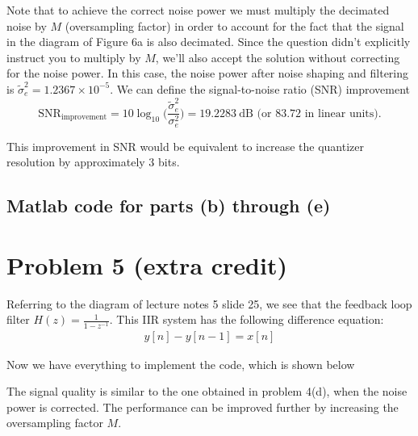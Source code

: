 \documentclass{article}
\begin{document}
Note that to achieve the correct noise power we must multiply the decimated noise by $M$ (oversampling factor) in order to account for the fact that the signal in the diagram of Figure 6a is also decimated. Since the question didn't explicitly instruct you to multiply by $M$, we'll also accept the solution without correcting for the noise power. In this case, the noise power after noise shaping and filtering is $\tilde{\sigma}_e^2 = 1.2367\times 10^{-5}$. We can define the signal-to-noise ratio (SNR) improvement 
\begin{equation}
\text{SNR}_{\text{improvement}} = 10\log_{10}\Big(\frac{\tilde{\sigma}_e^2}{\sigma_e^2}\Big) = 19.2283~\text{dB (or 83.72 in linear units)}.
\end{equation}

This improvement in SNR would be equivalent to increase the quantizer resolution by approximately 3 bits.

\subsection{Matlab code for parts (b) through (e)}


\section{Problem 5 (extra credit)}

Referring to the diagram of lecture notes 5 slide 25, we see that the feedback loop filter $H(z) = \frac{1}{1-z^{-1}}$. This IIR system has the following difference equation:
\begin{eqnarray}
y[n] - y[n-1] = x[n]
\end{eqnarray}

Now we have everything to implement the code, which is shown below



The signal quality is similar to the one obtained in problem 4(d), when the noise power is corrected. The performance can be improved further by increasing the oversampling factor $M$.
\end{document}
